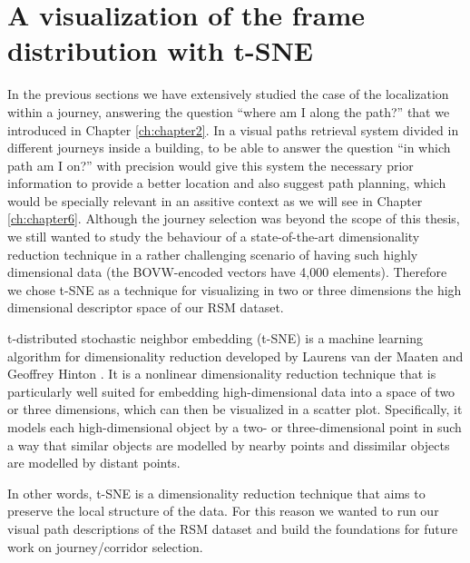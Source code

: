 \section{A visualization of the frame distribution with t-SNE}

In the previous sections we have extensively studied the case of the localization within a journey, answering the question ``where am I along the path?'' that we introduced in Chapter \ref{ch:chapter2}. In a visual paths retrieval system divided in different journeys inside a building, to be able to answer the question ``in which path am I on?'' with precision would give this system the necessary prior information to provide a better location and also suggest path planning, which would be specially relevant in an assitive context as we will see in Chapter \ref{ch:chapter6}. Although the journey selection was beyond the scope of this thesis, we still wanted to study the behaviour of a state-of-the-art dimensionality reduction technique in a rather challenging scenario of having such highly dimensional data (the BOVW-encoded vectors have 4,000 elements). Therefore we chose t-SNE as a technique for visualizing in two or three dimensions the high dimensional descriptor space of our RSM dataset.

t-distributed stochastic neighbor embedding (t-SNE) is a machine learning algorithm for dimensionality reduction developed by Laurens van der Maaten and Geoffrey Hinton \cite{maaten2009learning}. It is a nonlinear dimensionality reduction technique that is particularly well suited for embedding high-dimensional data into a space of two or three dimensions, which can then be visualized in a scatter plot. Specifically, it models each high-dimensional object by a two- or three-dimensional point in such a way that similar objects are modelled by nearby points and dissimilar objects are modelled by distant points.

In other words, t-SNE is a dimensionality reduction technique that aims to preserve the local structure of the data. For this reason we wanted to run our visual path descriptions of the RSM dataset and build the foundations for future work on journey/corridor selection.


